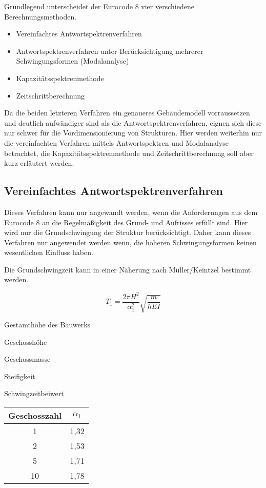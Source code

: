 Grundlegend unterscheidet der Eurocode 8 vier verschiedene Berechnungsmethoden.

\begin{itemize}
  \item Vereinfachtes Antwortspektrenverfahren
  \item Antwortspektrenverfahren unter Berücksichtigung mehrerer Schwingungsformen (Modalanalyse)
  \item Kapazitätsspektrenmethode
  \item Zeitschrittberechnung
\end{itemize}

Da die beiden letzteren Verfahren ein genaueres Gebäudemodell vorraussetzen und deutlich aufwändiger sind als die Antwortspektrenverfahren, eignen sich diese nur schwer für die Vordimensionierung von Strukturen. 
Hier werden weiterhin nur die vereinfachten Verfahren mittels Antwortspektren und Modalanalyse betrachtet, die Kapazitätsspektrenmethode und Zeitschrittberechnung soll aber kurz erläutert werden.

\subsection{Vereinfachtes Antwortspektrenverfahren}
\label{sec:Antwortspektrenverfahren}

Dieses Verfahren kann nur angewandt werden, wenn die Anforderungen aus dem Eurocode 8 an die Regelmäßigkeit des Grund- und Aufrisses erfüllt sind.
Hier wird nur die Grundschwingung der Struktur berücksichtigt. Daher kann dieses Verfahren nur angewendet werden wenn, die höheren Schwingungsformen keinen wesentlichen Einfluss haben.

Die Grundschwingzeit kann in einer Näherung nach Müller/Keintzel bestimmt werden.

\begin{equation*}
T_1 = \frac{2 \pi H^2}{\alpha_1^2}\sqrt{\frac{m}{hEI}}
\end{equation*}

\thinspace

\begin{multicols}{2}
 Gestamthöhe des Bauwerks \par
{} Geschosshöhe \par
{} Geschossmasse \par
{} Steifigkeit \par 
{} Schwingzeitbeiwert \par
\columnbreak
\begin{flushright}
\begin{tabular}{ |c|c| } 
 \hline
 Geschosszahl & $\alpha_1$ \\
 \hline\hline
 1 & 1,32 \\ 
 2 & 1,53 \\ 
 5 & 1,71 \\ 
 10 & 1,78 \\ 
 \hline
\end{tabular}
\end{flushright}
\end{multicols}

